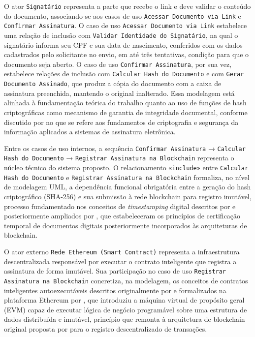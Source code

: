 \documentclass[
    12pt,
    a4paper,
    oneside,
    chapter=TITLE,
    section=TITLE,
    subsection=TITLE,
    subsubsection=TITLE,
    sumario=tradicional,
    english,
    brazil
]{abntex2}
\newcommand{\elem}[1]{\texttt{#1}}
\begin{document}
O ator \elem{Signatário} representa a parte que recebe o link e deve validar o conteúdo do documento, associando-se aos casos de uso \elem{Acessar Documento via Link} e \elem{Confirmar Assinatura}. O caso de uso \elem{Acessar Documento via Link} estabelece uma relação de inclusão com \elem{Validar Identidade do Signatário}, na qual o signatário informa seu CPF e sua data de nascimento, conferidos com os dados cadastrados pelo solicitante no envio, em até três tentativas, condição para que o documento seja aberto. O caso de uso \elem{Confirmar Assinatura}, por sua vez, estabelece relações de inclusão com \elem{Calcular Hash do Documento} e com \elem{Gerar Documento Assinado}, que produz a cópia do documento com a caixa de assinatura preenchida, mantendo o original inalterado. Essa modelagem está alinhada à fundamentação teórica do trabalho quanto ao uso de funções de hash criptográficas como mecanismo de garantia de integridade documental, conforme discutido por  no que se refere aos fundamentos de criptografia e segurança da informação aplicados a sistemas de assinatura eletrônica.

Entre os casos de uso internos, a sequência \elem{Confirmar Assinatura} → \elem{Calcular Hash do Documento} → \elem{Registrar Assinatura na Blockchain} representa o núcleo técnico do sistema proposto. O relacionamento \elem{«include»} entre \elem{Calcular Hash do Documento} e \elem{Registrar Assinatura na Blockchain} formaliza, no nível de modelagem UML, a dependência funcional obrigatória entre a geração do hash criptográfico (SHA-256) e sua submissão à rede blockchain para registro imutável, processo fundamentado nos conceitos de \emph{timestamping} digital descritos por  e posteriormente ampliados por , que estabeleceram os princípios de certificação temporal de documentos digitais posteriormente incorporados às arquiteturas de blockchain.

O ator externo \elem{Rede Ethereum (Smart Contract)} representa a infraestrutura descentralizada responsável por executar o contrato inteligente que registra a assinatura de forma imutável. Sua participação no caso de uso \elem{Registrar Assinatura na Blockchain} concretiza, na modelagem, os conceitos de contratos inteligentes autoexecutáveis descritos originalmente por  e formalizados na plataforma Ethereum por , que introduziu a máquina virtual de propósito geral (EVM) capaz de executar lógica de negócio programável sobre uma estrutura de dados distribuída e imutável, princípio que remonta à arquitetura de blockchain original proposta por  para o registro descentralizado de transações.
\end{document}

